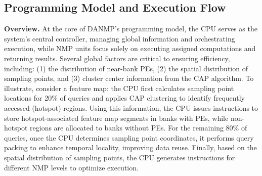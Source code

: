 \documentclass[sigconf]{acmart}
\begin{document}


\subsection{Programming Model and Execution Flow}
\label{execution_flow}
{\bf Overview.} At the core of DANMP's programming model, the CPU serves as the system’s central controller, managing global information and orchestrating execution, while NMP units focus solely on executing assigned computations and returning results. Several global factors are critical to ensuring efficiency, including: (1) the distribution of near-bank PEs, (2) the spatial distribution of sampling points, and (3) cluster center information from the CAP algorithm. To illustrate, consider a feature map: the CPU first calculates sampling point locations for 20\% of queries and applies CAP clustering to identify frequently accessed (hotspot) regions. Using this information, the CPU issues instructions to store hotspot-associated feature map segments in banks with PEs, while non-hotspot regions are allocated to banks without PEs. For the remaining 80\% of queries, once the CPU determines sampling point coordinates, it performs query packing to enhance temporal locality, improving data reuse. Finally, based on the spatial distribution of sampling points, the CPU generates instructions for different NMP levels to optimize execution.
\end{document}

